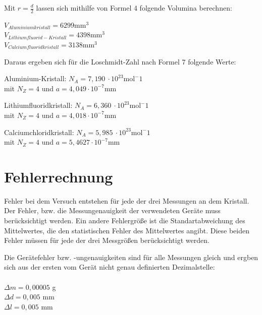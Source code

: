 \documentclass[12pt,a4paper,titlepage,headinclude,bibtotoc]{scrartcl}
\begin{document}
Mit $r=\frac{d}{2}$ lassen sich mithilfe von Formel 4 folgende Volumina berechnen:

\vspace{3mm}
$V_{Aluminiumkristall} = 6299 \mathrm{mm^3}$\\
$V_{Lithiumfluorid-Kristall} =4398 \mathrm{mm^3}$\\
$V_{Calciumfluoridkristall} = 3138 \mathrm{mm^3}$\\

\vspace{3mm}

Daraus ergeben sich für die Loschmidt-Zahl nach Formel 7 folgende Werte:
\vspace{3mm}

Aluminium-Kristall: \qquad $N_A = 7,190 \ \cdot 10^{23} \mathrm{mol^-1}$\\
mit $N_Z =4$ und $a=4,049\cdot 10^{-7} \mathrm{mm}$\\
\vspace{3mm}

Lithiumfluoridkristall: \qquad $N_A = 6,360 \ \cdot 10^{23} \mathrm{mol^-1}$\\
mit $N_Z =4$ und $a=4,018\cdot 10^{-7} \mathrm{mm}$\\
\vspace{3mm}

Calciumchloridkristall: \qquad $N_A = 5,985 \ \cdot 10^{23} \mathrm{mol^-1}$\\
mit $N_Z =4$ und $a=5,4627\cdot 10^{-7} \mathrm{mm}$\\
\vspace{3mm}


\section{Fehlerrechnung}
Fehler bei dem Versuch entstehen für jede der drei Messungen an dem Kristall. Der Fehler, bzw. die Messungenauigkeit der verwendeten Geräte muss berücksichtigt werden. Ein andere Fehlergröße ist die Standartabweichung des Mittelwertes, die den statistischen Fehler des Mittelwertes angibt. 
Diese beiden Fehler müssen für jede der drei Messgrößen berücksichtigt werden.

Die Gerätefehler bzw. -ungenauigkeiten sind für alle Messungen gleich und ergben sich aus der ersten vom Gerät nicht genau definierten Dezimalstelle:
\\
\\
$\Delta m = 0,00005$ g \\
$\Delta d = 0,005$ mm\\
$\Delta l = 0,005 $ mm\\
\\
\end{document}

